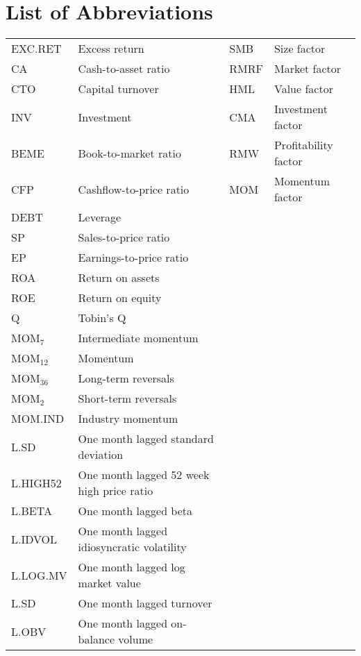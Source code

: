 \documentclass[12pt]{article}
\begin{document}
\section*{List of Abbreviations}
\begin{tabular}{l l l l}
EXC.RET & Excess return & SMB & Size factor\\
CA & Cash-to-asset ratio & RMRF & Market factor\\
CTO & Capital turnover & HML & Value factor\\
INV & Investment & CMA & Investment factor\\
BEME & Book-to-market ratio & RMW & Profitability factor\\
CFP & Cashflow-to-price ratio & MOM & Momentum factor\\
DEBT & Leverage\\
SP & Sales-to-price ratio\\
EP & Earnings-to-price ratio \\
ROA & Return on assets\\
ROE & Return on equity \\
Q & Tobin's Q\\
MOM$_7$ & Intermediate momentum\\
MOM$_{12}$ & Momentum\\
MOM$_{36}$ & Long-term reversals\\
MOM$_{2}$ & Short-term reversals \\
MOM.IND & Industry momentum\\
L.SD & One month lagged standard deviation\\
L.HIGH52 & One month lagged 52 week high price ratio\\
L.BETA & One month lagged beta\\
L.IDVOL & One month lagged idiosyncratic volatility\\
L.LOG.MV & One month lagged log market value\\
L.SD & One month lagged turnover\\
L.OBV & One month lagged on-balance volume\\
\end{tabular}

\newpage
\end{document}
